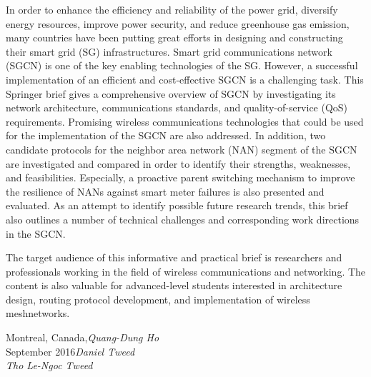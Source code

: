 %
%

\preface

In order to enhance the efficiency and reliability of the power grid, diversify energy resources, improve power security, and reduce greenhouse gas emission, many countries have been putting great efforts in designing and constructing their smart grid (SG) infrastructures. Smart grid communications network (SGCN) is one of the key enabling technologies of the SG. However, a successful implementation of an efficient and cost-effective SGCN is a challenging task. This Springer brief gives a comprehensive overview of SGCN by investigating its network architecture, communications standards, and quality-of-service (QoS) requirements. Promising wireless communications technologies that could be used for the implementation of the SGCN are also addressed. In addition, two candidate protocols for the neighbor area network (NAN) segment of the SGCN are investigated and compared in order to identify their strengths, weaknesses, and feasibilities. Especially, a proactive parent switching mechanism to improve the resilience of NANs against smart meter failures is also presented and evaluated. As an attempt to identify possible future research trends, this brief also outlines a number of technical challenges and corresponding work directions in the SGCN.

The target audience of this informative and practical brief is researchers and professionals working in the field of wireless communications and networking. The content is also valuable for advanced-level students interested in architecture design, routing protocol development, and implementation of wireless meshnetworks.

\vspace{\baselineskip}
\begin{flushright}\noindent
Montreal, Canada,\hfill {\it Quang-Dung Ho}\\
September 2016\hfill {\it Daniel Tweed}\\
\hfill {\it Tho Le-Ngoc Tweed}\\
\end{flushright}


